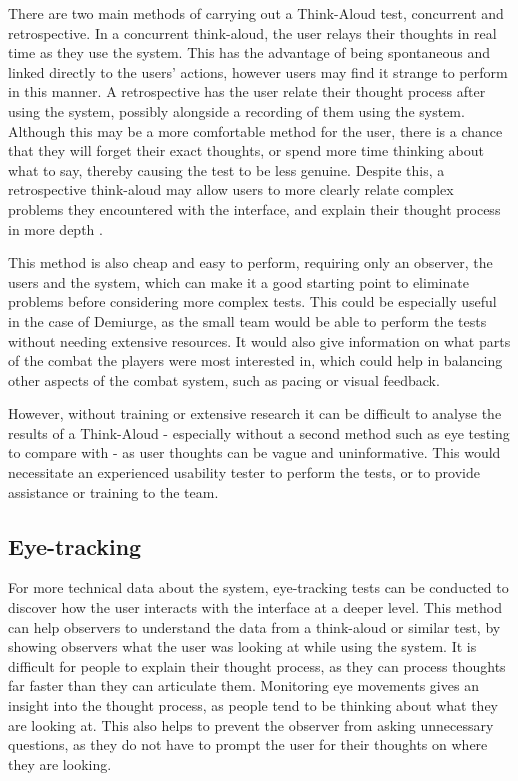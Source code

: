 \documentclass{scrartcl}
\begin{document}
There are two main methods of carrying out a Think-Aloud test, concurrent and retrospective. \cite{exploringThinkAloud} In a concurrent think-aloud, the user relays their thoughts in real time as they use the system. This has the advantage of being spontaneous and linked directly to the users' actions, however users may find it strange to perform in this manner. A retrospective has the user relate their thought process after using the system, possibly alongside a recording of them using the system. Although this may be a more comfortable method for the user, there is a chance that they will forget their exact thoughts, or spend more time thinking about what to say, thereby causing the test to be less genuine. \cite{eyeAndThink} Despite this, a retrospective think-aloud may allow users to more clearly relate complex problems they encountered with the interface, and explain their thought process in more depth . \cite{concurrentVRetro}

This method is also cheap and easy to perform, requiring only an observer, the users and the system, which can make it a good starting point to eliminate problems before considering more complex tests. This could be especially useful in the case of Demiurge, as the small team would be able to perform the tests without needing extensive resources. It would also give information on what parts of the combat the players were most interested in, which could help in balancing other aspects of the combat system, such as pacing or visual feedback.

However, without training or extensive research it can be difficult to analyse the results of a Think-Aloud - especially without a second method such as eye testing to compare with - as user thoughts can be vague and uninformative. This would necessitate an experienced usability tester to perform the tests, or to provide assistance or training to the team. \cite{assessingThinkAloud}


\subsection{Eye-tracking}
For more technical data about the system, eye-tracking tests can be conducted to discover how the user interacts with the interface at a deeper level. This method can help observers to understand the data from a think-aloud or similar test, by showing observers what the user was looking at while using the system. It is difficult for people to explain their thought process, as they can process thoughts far faster than they can articulate them. Monitoring eye movements gives an insight into the thought process, as people tend to be thinking about what they are looking at. \cite{eyeTracking} This also helps to prevent the observer from asking unnecessary questions, as they do not have to prompt the user for their thoughts on where they are looking. \cite{eyeAndThink}
\end{document}
